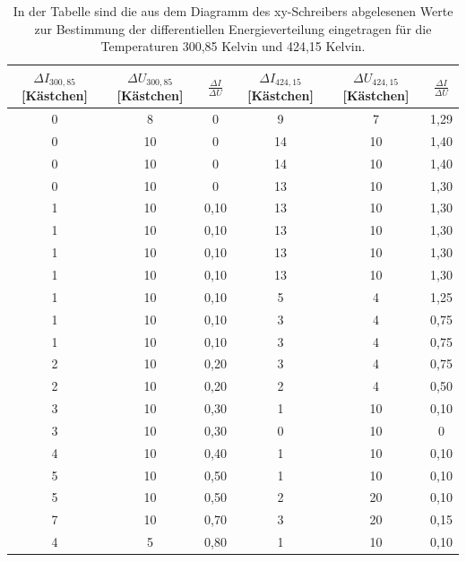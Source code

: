 \documentclass[titlepage = firstcover]{scrartcl}
\begin{document}
        \begin{table}[h]
            \centering
            \caption{In der Tabelle sind die aus dem Diagramm des xy-Schreibers abgelesenen Werte zur Bestimmung der differentiellen Energieverteilung eingetragen für die Temperaturen 300,85 Kelvin und 424,15 Kelvin.}
            \label{tab:Tabellexy}
           
            \begin{tabular}{c c c c c c}
                \toprule
                {$\Delta I_{300,85}$ [Kästchen]} & {$\Delta U_{300,85}$ [Kästchen]} & {$\frac{\Delta I}{\Delta U}$} & {$\Delta I_{424,15}$ [Kästchen]} & {$\Delta U_{424,15}$ [Kästchen]} & {$\frac{\Delta I}{\Delta U}$}\\
                \midrule
                    0 & 8 & 0 & 9 & 7 & 1,29\\
                    0 & 10 & 0 & 14 & 10 & 1,40\\
                    0 & 10 & 0 & 14 & 10 & 1,40\\
                    0 & 10 & 0 & 13 & 10 & 1,30\\
                    1 & 10 & 0,10 & 13 & 10 & 1,30\\
                    1 & 10 & 0,10 & 13 & 10 & 1,30\\
                    1 & 10 & 0,10 & 13 & 10 & 1,30\\
                    1 & 10 & 0,10 & 13 & 10 & 1,30\\
                    1 & 10 & 0,10 & 5 & 4 & 1,25\\
                    1 & 10 & 0,10 & 3 & 4 & 0,75\\
                    1 & 10 & 0,10 & 3 & 4 & 0,75\\
                    2 & 10 & 0,20 & 3 & 4 & 0,75\\
                    2 & 10 & 0,20 & 2 & 4 & 0,50\\
                    3 & 10 & 0,30 & 1 & 10 & 0,10\\
                    3 & 10 & 0,30 & 0 & 10 & 0\\
                    4 & 10 & 0,40 & 1 & 10 & 0,10\\
                    5 & 10 & 0,50 & 1 & 10 & 0,10\\
                    5 & 10 & 0,50 & 2 & 20 & 0,10\\
                    7 & 10 & 0,70 & 3 & 20 & 0,15\\
                    4 & 5 & 0,80 & 1 & 10 & 0,10\\

\end{tabular}
\end{table}
\end{document}
